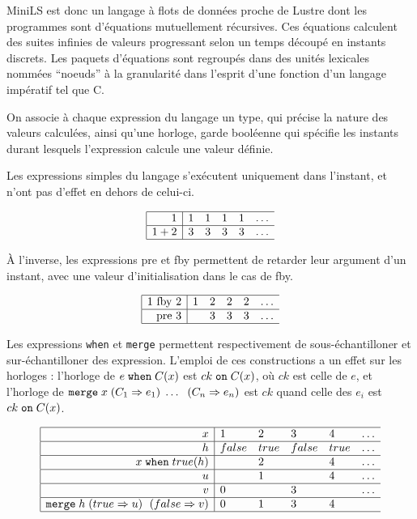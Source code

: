 \documentclass[a4paper]{article}
\newcommand{\mybox}[1]{\mbox{\tt{#1}}}
\newcommand{\When}[3]{#1 \; \mybox{when} \; #2(#3)}
\newcommand{\Merge}[5]{\mybox{merge} \; #1 \; (#2 \Rightarrow #3) \; \dots \; \
  (#4 \Rightarrow #5)}
\newcommand{\Merges}[5]{\mybox{merge} \; #1 \; (#2 \Rightarrow #3) \; \
  (#4 \Rightarrow #5)}
\newcommand{\On}[3]{#1 \; \mybox{on} \; #2 (#3)}
\begin{document}
MiniLS est donc un langage \`a flots de donn\'ees proche de Lustre dont les
programmes sont d'\'equations mutuellement r\'ecursives. Ces \'equations calculent des
suites infinies de valeurs progressant selon un temps d\'ecoup\'e en instants
discrets.  Les paquets d'\'equations sont regroup\'es dans des unit\'es lexicales
nomm\'ees ``noeuds'' \`a la granularit\'e dans l'esprit d'une fonction d'un langage
imp\'eratif tel que C.

On associe \`a chaque expression du langage un type, qui pr\'ecise la nature des
valeurs calcul\'ees, ainsi qu'une horloge, garde bool\'eenne qui sp\'ecifie les
instants durant lesquels l'expression calcule une valeur d\'efinie.

Les expressions simples du langage s'ex\'ecutent uniquement dans l'instant, et
n'ont pas d'effet en dehors de celui-ci.

\[
\begin{array}{|r|llllllllllllllllllllllllllll}
  \hline
  1     & 1 & 1 & 1 & 1 & \dots \\
  \hline
  1 + 2 & 3 & 3 & 3 & 3 & \dots \\
  \hline
\end{array}
\]

\`A l'inverse, les expressions \textrm{pre} et \textrm{fby} permettent de retarder
leur argument d'un instant, avec une valeur d'initialisation dans le cas de
\textrm{fby}.

\[
\begin{array}{|r|llllllllllllllllllllllllllll}
  \hline
  1 \ \mathrm{fby} \ 2 & 1 & 2 & 2 & 2 & \dots \\
  \hline
  \mathrm{pre} \ 3 &  & 3 & 3 & 3 & \dots \\
  \hline
\end{array}
\]

Les expressions \texttt{when} et \texttt{merge} permettent respectivement de
sous-\'echantilloner et sur-\'echantilloner des expression. L'emploi de ces
constructions a un effet sur les horloges : l'horloge de $\When{e}{C}{x}$ est
$\On{ck}{C}{x}$, o\`u $ck$ est celle de $e$, et l'horloge de
$\Merge{x}{C_1}{e_1}{C_n}{e_n}$ est $ck$ quand celle des $e_i$ est
$\On{ck}{C}{x}$.

\[
\begin{array}{|r|llllllllllllllllllllllllllll}
  \hline
  x & 1 & 2 & 3 & 4 & \dots \\
  \hline
  h & false & true & false & true & \dots \\
  \hline
  \When{x}{true}{h} & & 2 & & 4 & \dots \\
  \hline
  u &  & 1 & & 4 & \dots \\
  \hline
  v & 0 & & 3 & & \dots \\
  \hline
  \Merges{h}{true}{u}{false}{v} & 0 & 1 & 3 & 4 \\
  \hline
\end{array}
\]
\end{document}
